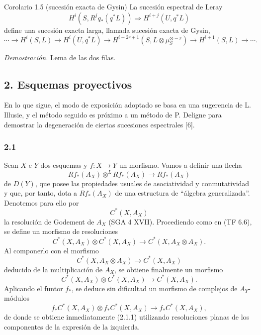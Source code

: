 \begin{statement}{Corolario 1.5 (sucesión exacta de Gysin)}
La sucesión espectral de Leray
\[
H^i(S,R^j q_*(q^*L))\Rightarrow H^{i+j}(U,q^*L)
\]
define una sucesión exacta larga, llamada sucesión exacta de Gysin,
\[
\cdots\longrightarrow H^i(S,L)\longrightarrow H^i(U,q^*L)\longrightarrow
H^{i-2r+1}(S,L\otimes\mu_S^{\otimes -r})\longrightarrow H^{i+1}(S,L)\longrightarrow\cdots.
\]
\end{statement}

\emph{Demostración.} Lema de las dos filas.

\subsection*{2. Esquemas proyectivos}

En lo que sigue, el modo de exposición adoptado se basa en una sugerencia de L. Illusie, y el método seguido es próximo a un método de P. Deligne para demostrar la degeneración de ciertas sucesiones espectrales [6].

\subsubsection*{2.1}
Sean $X$ e $Y$ dos esquemas y $f:X\to Y$ un morfismo. Vamos a definir una flecha
\[
Rf_*(A_X)\otimes^L Rf_*(A_X)\longrightarrow Rf_*(A_X)
\tag{2.1.1}
\]
de $D(Y)$, que posee las propiedades usuales de asociatividad y conmutatividad y que, por tanto, dota a $Rf_*(A_X)$ de una estructura de ``álgebra generalizada''. Denotemos para ello por
\[
C^*(X,A_X)
\]
la resolución de Godement de $A_X$ (SGA 4 XVII). Procediendo como en (TF 6.6), se define un morfismo de resoluciones
\[
C^*(X,A_X)\otimes C^*(X,A_X)\longrightarrow C^*(X,A_X\otimes A_X).
\]
Al componerlo con el morfismo
\[
C^*(X,A_X\otimes A_X)\longrightarrow C^*(X,A_X)
\]
deducido de la multiplicación de $A_X$, se obtiene finalmente un morfismo
\[
C^*(X,A_X)\otimes C^*(X,A_X)\longrightarrow C^*(X,A_X).
\tag{2.1.2}
\]
Aplicando el funtor $f_*$, se deduce sin dificultad un morfismo de complejos de $A_Y$-módulos
\[
f_*C^*(X,A_X)\otimes f_*C^*(X,A_X)\longrightarrow f_*C^*(X,A_X),
\]
de donde se obtiene inmediatamente (2.1.1) utilizando resoluciones planas de los componentes de la expresión de la izquierda.
